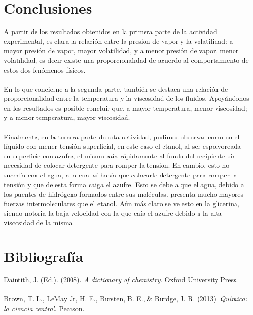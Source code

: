 \documentclass{article}
\begin{document}
\section{Conclusiones}

A partir de los resultados obtenidos en la primera parte de la actividad experimental, es clara la relación entre la presión de vapor y la volatilidad: a mayor presión de vapor, mayor volatilidad, y a menor presión de vapor, menor volatilidad, es decir existe una proporcionalidad de acuerdo al comportamiento de estos dos fenómenos físicos.
\\
\\
En lo que concierne a la segunda parte, también se destaca una relación de proporcionalidad entre la temperatura y la viscosidad de los fluidos. Apoyándonos en los resultados es posible concluir que, a mayor temperatura, menor viscosidad; y a menor temperatura, mayor viscosidad.
\\
\\
Finalmente, en la tercera parte de esta actividad, pudimos observar como en el líquido con menor tensión superficial, en este caso el etanol, al ser espolvoreada su superficie con azufre, el mismo caía rápidamente al fondo del recipiente sin necesidad de colocar detergente para romper la tensión. En cambio, esto no sucedía con el agua, a la cual sí había que colocarle detergente para romper la tensión y que de esta forma caiga el azufre. Esto se debe a que el agua, debido a los puentes de hidrógeno formados entre sus moléculas, presenta mucho mayores fuerzas intermoleculares que el etanol. Aún más claro se ve esto en la glicerina, siendo notoria la baja velocidad con la que caía el azufre debido a la alta viscosidad de la misma.

\section{Bibliografía}

Daintith, J. (Ed.). (2008). \textit{A dictionary of chemistry.} Oxford University Press.
\\
\\
Brown, T. L., LeMay Jr, H. E., Bursten, B. E., \& Burdge, J. R. (2013). \textit{Química: la ciencia central.} Pearson.
\end{document}
